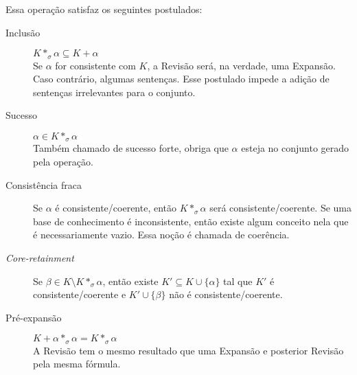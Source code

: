 Essa operação satisfaz os seguintes postulados:

\begin{description}
	\item[Inclusão] $ K \ast_\sigma \alpha \subseteq K + \alpha $ \\
	Se $ \alpha $ for consistente com $ K $, a Revisão será, na verdade, uma Expansão. Caso contrário, algumas sentenças. Esse postulado impede a adição de sentenças irrelevantes para o conjunto.
	\item[Sucesso] $ \alpha \in K \ast_\sigma \alpha $\\
	Também chamado de sucesso forte, obriga que $ \alpha $ esteja no conjunto gerado pela operação.
	\item[Consistência fraca] Se $ \alpha $ é consistente/coerente, então $ K \ast_\sigma \alpha $ será consistente/coerente. Se uma base de conhecimento é inconsistente, então existe algum conceito nela que é necessariamente vazio. Essa noção é chamada de coerência.
	\item[\textit{Core-retainment}] Se $ \beta \in K \setminus K \ast_\sigma \alpha $, então existe $ K' \subseteq K \cup \{\alpha\} $ tal que $ K' $ é consistente/coerente e $ K' \cup \{\beta\}$ não é consistente/coerente.
	\item[Pré-expansão] $ K + \alpha \ast_\sigma \alpha = K \ast_\sigma \alpha $ \\
	A Revisão tem o mesmo resultado que uma Expansão e posterior Revisão pela mesma fórmula. 
\end{description}